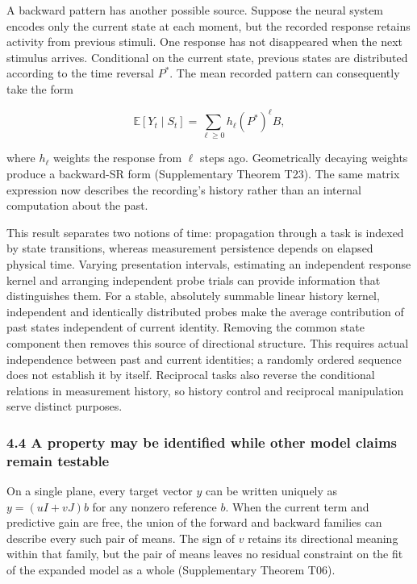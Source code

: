 \documentclass[11pt,a4paper]{article}
\begin{document}
\par
\noindent\begin{minipage}{\linewidth}

A backward pattern has another possible source. Suppose the neural
system encodes only the current state at each moment, but the recorded
response retains activity from previous stimuli. One response has not
disappeared when the next stimulus arrives. Conditional on the current
state, previous states are distributed according to the time reversal
\(P^*\). The mean recorded pattern can consequently take the form

\[
\mathbb E[Y_t\mid S_t]
=\sum_{\ell\geq0}h_\ell(P^*)^\ell B,
\]

\end{minipage}\par

where \(h_\ell\) weights the response from \(\ell\) steps ago.
Geometrically decaying weights produce a backward-SR form (Supplementary
Theorem T23). The same matrix expression now describes the recording's
history rather than an internal computation about the past.

This result separates two notions of time: propagation through a task is
indexed by state transitions, whereas measurement persistence depends on
elapsed physical time. Varying presentation intervals, estimating an
independent response kernel and arranging independent probe trials can
provide information that distinguishes them. For a stable, absolutely
summable linear history kernel, independent and identically distributed
probes make the average contribution of past states independent of
current identity. Removing the common state component then removes this
source of directional structure. This requires actual independence
between past and current identities; a randomly ordered sequence does
not establish it by itself. Reciprocal tasks also reverse the
conditional relations in measurement history, so history control and
reciprocal manipulation serve distinct purposes.

\subsubsection{4.4 A property may be identified while other model claims
remain
testable}\label{a-property-may-be-identified-while-other-model-claims-remain-testable}

On a single plane, every target vector \(y\) can be written uniquely as
\(y=(uI+vJ)b\) for any nonzero reference \(b\). When the current term
and predictive gain are free, the union of the forward and backward
families can describe every such pair of means. The sign of \(v\)
retains its directional meaning within that family, but the pair of
means leaves no residual constraint on the fit of the expanded model as
a whole (Supplementary Theorem T06).
\end{document}
